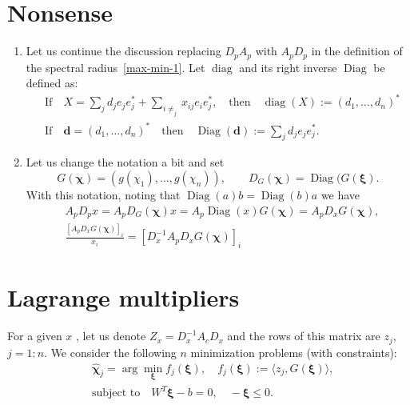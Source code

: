 \documentclass[12pt]{amsart}
\theoremstyle{definition}
\begin{document}
\section{Nonsense}
\begin{enumerate}
\item Let us continue the discussion replacing $D_pA_p$ with $A_pD_p$ in the definition of the spectral radius~\eqref{max-min-1}. Let $\operatorname{diag}$ and its right inverse $\operatorname{Diag}$ be defined as:
    \begin{equation}
        \begin{aligned}
        &\mbox{If}\quad X=\sum_j d_j e_j e_j^*+\sum_{i\neq_j}x_{ij}e_ie_j^*, 
            \quad\mbox{then}\quad \operatorname{diag}(X):=(d_1,\ldots,d_n)^*\\            
        &\mbox{If}\quad \bm{d}=(d_1,\ldots,d_n)^* 
            \quad\mbox{then} \quad \operatorname{Diag}(\bm{d}):=\sum_j d_j e_j e_j^*.
        \end{aligned}        
    \end{equation}
    \item Let us change the notation a bit and set 
    \[
    G(\bm{\chi})=(g(\chi_1),\ldots,g(\chi_n)),\qquad
    D_G(\bm{\chi})=\operatorname{Diag}(G(\bm{\xi}).
   \]
   With this notation, noting that $\operatorname{Diag}(a)b=\operatorname{Diag}(b)a$ we have
    \begin{equation}
        \begin{aligned}
            &A_p D_p x = A_pD_G(\bm{\chi}) x = A_p\operatorname{Diag}(x)G(\bm{\chi})=A_pD_xG(\bm{\chi}),\\
            &\frac{[A_pD_xG(\bm{\chi})]_i}{x_i}=\left[ D_x^{-1}A_pD_xG(\bm{\chi})\right]_i
        \end{aligned}
    \end{equation}
\end{enumerate}

\section{Lagrange multipliers}
For a given $x$ , let us denote $Z_x=D_x^{-1}A_cD_x$ and the rows of this matrix are $z_{j}$, $j=1:n$. We consider the following $n$ minimization problems (with constraints): 
\begin{equation}\label{22}
    \begin{aligned}
        &\bm{\widehat\chi}_j=\arg\min_{\bm{\xi}}f_j(\bm{\xi}),\quad f_j(\bm\xi):=\langle z_j,G(\bm{\xi})\rangle, \\
        &\mbox{subject to}\quad W^T \bm{\xi}-b=0, \quad -\bm{\xi}\le 0.
    \end{aligned}
\end{equation}
\end{document}

